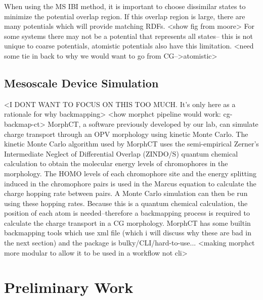 When using the MS IBI method, it is important to choose dissimilar states to minimize the potential overlap region.
If this overlap region is large, there are many potentials which will provide matching RDFs. <show fig from moore>
For some systems there may not be a potential that represents all states-- this is not unique to coarse potentials, atomistic potentials also have this limitation.
<need some tie in back to why we would want to go from CG-->atomistic>

\subsection*{Mesoscale Device Simulation}

<I DONT WANT TO FOCUS ON THIS TOO MUCH. It's only here as a rationale for why backmapping>
<how morphct pipeline would work: cg-backmap-ct>
MorphCT, a software previously developed by our lab, can simulate charge transport through an OPV morphology using kinetic Monte Carlo\cite{Miller2018a,MorphCT,morphct2.2}.
The kinetic Monte Carlo algorithm used by MorphCT uses the semi-empirical Zerner's Intermediate Neglect of Differential Overlap (ZINDO/S) quantum chemical calculation to obtain the molecular energy levels of chromophores in the morphology.
The HOMO levels of each chromophore site and the energy splitting induced in the chromophore pairs is used in the Marcus equation to calculate the charge hopping rate between pairs.
A Monte Carlo simulation can then be run using these hopping rates.
Because this is a quantum chemical calculation, the position of each atom is needed--therefore a backmapping process is required to calculate the charge transport in a CG morphology.
MorphCT has some builtin backmapping tools which use xml file (which i will discuss why these are bad in the next section) and the package is bulky/CLI/hard-to-use...
<making morphct more modular to allow it to be used in a workflow not cli>

\section*{Preliminary Work}

